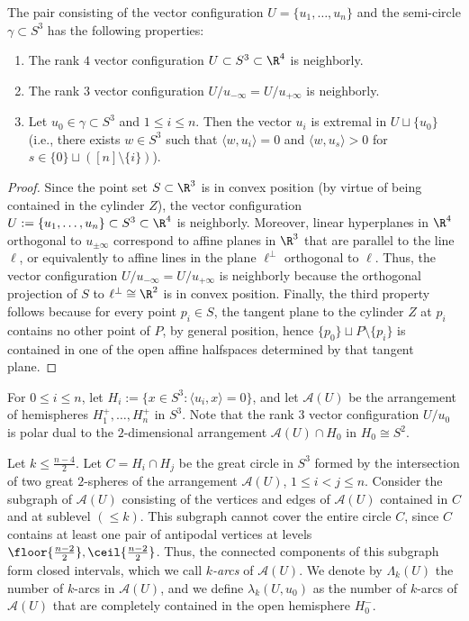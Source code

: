 %
\begin{lemma} 
\label{lem:special}
The pair consisting of the vector configuration $U=\{u_1,\dots,u_n\}$ and the semi-circle $\gamma\subset S^3$ has the following properties:
\begin{enumerate}
\item The rank $4$ vector configuration $U \subset S^3 \subset \R^4$ is neighborly.
\item The rank $3$ vector configuration $U/u_{-\infty}=U/u_{+\infty}$ is neighborly.
\item Let $u_0 \in \gamma \subset S^3$ and $1\leq i \leq n$. Then the vector $u_i$ is extremal in $U \sqcup \{ u_0 \}$ (i.e., there exists $w\in S^3$ such that $\langle w,u_i\rangle =0$ and $\langle w,u_s\rangle > 0$ for $s\in \{0\}\sqcup ([n]\setminus \{i\})$). 
\end{enumerate}
\end{lemma}
\begin{proof} Since the point set $S\subset \R^3$ is in convex position (by virtue of being contained in the cylinder $Z$), the vector configuration $U:=\{u_1,\dots,u_n\} \subset S^3 \subset \R^4$ is neighborly. 
%
Moreover, linear hyperplanes in $\R^4$ orthogonal to $u_{\pm \infty}$ correspond to affine planes in $\R^3$ that are parallel to the line $\ell$, or equivalently to affine lines in the plane $\ell^\bot$ orthogonal to $\ell$. Thus, the vector configuration $U/u_{-\infty}=U/u_{+\infty}$ is neighborly because the orthogonal projection of $S$ to $\ell^\bot\cong \R^2$ is in convex position. 
%
Finally, the third property follows because for every point $p_i \in S$, the tangent plane to the cylinder $Z$ at $p_i$ contains no other point of $P$, by general position, hence $\{p_0\}\sqcup P\setminus\{p_i\}$ is contained in one of the open affine halfspaces determined by that tangent plane.
\end{proof}
For $0\leq i \leq n$, let $H_i:=\{x\in S^3\colon \langle u_i,x\rangle =0\}$, and let $\mathcal{A}(U)$ be the arrangement of hemispheres $H_1^+,\dots, H_n^+$ in $S^3$. Note that the rank $3$ vector configuration $U/u_0$ is polar dual to the $2$-dimensional arrangement $\mathcal{A}(U)\cap H_0$ in $H_0 \cong S^2$.
%
\begin{definition} 
\label{def:k-arcs}
Let $k\leq \frac{n-4}{2}$. Let $C=H_i\cap H_j$ be the great circle in $S^3$ formed by the intersection of two great $2$-spheres of the arrangement $\mathcal{A}(U)$, $1\leq i<j\leq n$. Consider the subgraph of $\mathcal{A}(U)$ consisting of the vertices and edges of $\mathcal{A}(U)$ contained in $C$ and at sublevel $(\leq k)$. This subgraph cannot cover the entire circle $C$, since $C$ contains at least one pair of antipodal vertices at levels $\floor{\frac{n-2}{2}}, \ceil{\frac{n-2}{2}}$. Thus, the connected components of this subgraph form closed intervals, which we call \emph{$k$-arcs} of $\mathcal{A}(U)$. 
%
We denote by  $\Lambda_k(U)$ the number of $k$-arcs in $\mathcal{A}(U)$, and we define $\lambda_k(U,u_0)$ as the number of $k$-arcs of $\mathcal{A}(U)$ that are completely contained in the open hemisphere $H_0^-$.
\end{definition}
